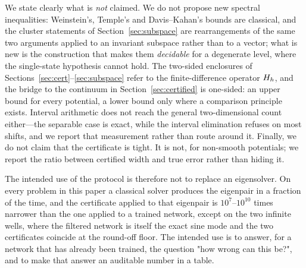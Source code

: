 We state clearly what is \emph{not} claimed. We do not propose new spectral
inequalities: Weinstein's, Temple's and Davis--Kahan's bounds are classical,
and the cluster statements of Section~\ref{sec:subspace} are rearrangements of
the same two arguments applied to an invariant subspace rather than to a
vector; what is new is the construction that makes them \emph{decidable}
for a degenerate level, where the single-state hypothesis cannot hold. The two-sided
enclosures of Sections~\ref{sec:cert}--\ref{sec:subspace} refer to the
finite-difference operator $H_h$, and the bridge to the continuum in
Section~\ref{sec:certified} is one-sided: an upper bound for every potential,
a lower bound only where a comparison principle exists. Interval arithmetic
does not reach the general two-dimensional count either---the separable case
is exact, while the interval elimination refuses on most shifts, and we report
that measurement rather than route around it. Finally, we do not
claim that the certificate is tight. It is not, for non-smooth potentials; we
report the ratio between certified width and true error rather than hiding it.

The intended use of the protocol is therefore not to replace an eigensolver.
On every problem in this paper a classical solver produces the eigenpair in a
fraction of the time, and the certificate applied to that eigenpair is
$10^{7}$--$10^{10}$ times narrower than the one applied to a trained network,
except on the two infinite wells, where the filtered network is itself the
exact sine mode and the two certificates coincide at the round-off floor.
The intended use is to answer, for a network that has already been trained,
the question "how wrong can this be?", and to make that answer an auditable
number in a table.
